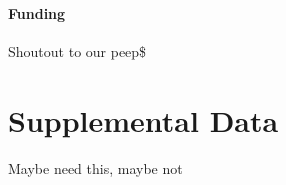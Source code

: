 \documentclass{frontiersSCNS} %
\begin{document}
\paragraph{Funding\textcolon} Shoutout to our peep\$

\section*{Supplemental Data}
Maybe need this, maybe not






\end{document}
